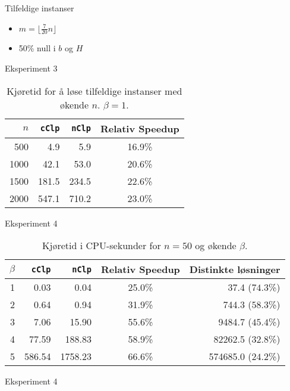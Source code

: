 \documentclass{beamer}
\begin{document}
\begin{frame}{Tilfeldige instanser}
\begin{itemize}
\item $m = \lfloor \frac{7}{20}n \rfloor$
\item 50\% null i $b$ og $H$
\end{itemize}
\end{frame}



\begin{frame}{Eksperiment 3}
\begin{table}[ht!]
    \centering
    \caption{Kjøretid for å løse tilfeldige instanser med økende $n$. $\beta = 1$.}
    \label{table:expfour}
\begin{tabular}{rrrc}
    $n$ & \texttt{cClp}  & \texttt{nClp}  & Relativ Speedup \\ \hline
    500 & 4.9   & 5.9   & 16.9\% \\
   1000 & 42.1  & 53.0  & 20.6\% \\
   1500 & 181.5 & 234.5 & 22.6\% \\
   2000 & 547.1 & 710.2 & 23.0\%
\end{tabular}
\end{table}
\end{frame}



\begin{frame}{Eksperiment 4}
\begin{table}[ht!]
\centering
\caption{Kjøretid i CPU-sekunder for $n = 50$ og økende $\beta$.}
\begin{tabular}{rrrcr}
      $\beta$ & \texttt{cClp} & \texttt{nClp} & Relativ Speedup & Distinkte løsninger\\ \hline
       1  & 0.03 & 0.04 & 25.0\% & 37.4 ($74.3$\%) \\
       2  & 0.64 & 0.94 & 31.9\% & 744.3 ($58.3$\%) \\
       3  & 7.06 & 15.90 & 55.6\% & 9484.7 ($45.4$\%) \\
       4  & 77.59 & 188.83 & 58.9\% & 82262.5 ($32.8$\%) \\
       5  & 586.54 & 1758.23 & 66.6\% & 574685.0 ($24.2$\%) \\
\end{tabular}
\label{table:exptwo}
\end{table}
\end{frame}



\begin{frame}{Eksperiment 4}

\end{frame}
\end{document}
